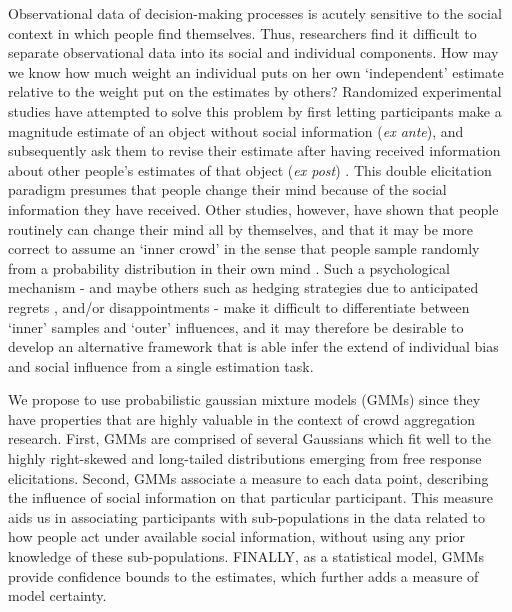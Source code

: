 \documentclass[9pt,twocolumn,twoside,lineno]{pnas-new}
\begin{document}
Observational data of decision-making processes is acutely sensitive to the social context in which people find themselves. Thus, researchers find it difficult to separate observational data into its social and individual components. How may we know how much weight an individual puts on her own ‘independent’ estimate relative to the weight put on the estimates by others? Randomized experimental studies have attempted to solve this problem by first letting participants make a magnitude estimate of an object without social information (\textit{ex ante}), and subsequently ask them to revise their estimate after having received information about other people’s estimates of that object (\textit{ex post}) \cite{becker2017network, jayles2017social, lorenz2011social, sniezek1995cueing, mavrodiev2013quantifying}. This double elicitation paradigm presumes that people change their mind because of the social information they have received. Other studies, however, have shown that people routinely can change their mind all by themselves, and that it may be more correct to assume an `inner crowd' in the sense that people sample randomly from a probability distribution in their own mind \cite{vul2008measuring, herzog2009wisdom, herzog2014harnessing}. Such a psychological mechanism - and maybe others such as hedging strategies due to anticipated regrets \cite{bell1982regret}, and/or disappointments \cite{loomes1986disappointment} - make it difficult to differentiate between `inner' samples and `outer' influences, and it may therefore be desirable to develop an alternative framework that is able infer the extend of individual bias and social influence from a single estimation task.

We propose to use probabilistic gaussian mixture models (GMMs) since they have properties that are highly valuable in the context of crowd aggregation research. First, GMMs are comprised of several Gaussians which fit well to the highly right-skewed and long-tailed distributions emerging from free response elicitations. Second, GMMs associate a measure to each data point, describing the influence of social information on that particular participant. This measure aids us in associating participants with sub-populations in the data related to how people act under available social information, without using any prior knowledge of these sub-populations. FINALLY, as a statistical model, GMMs provide confidence bounds to the estimates, which further adds a measure of model certainty.
\end{document}
